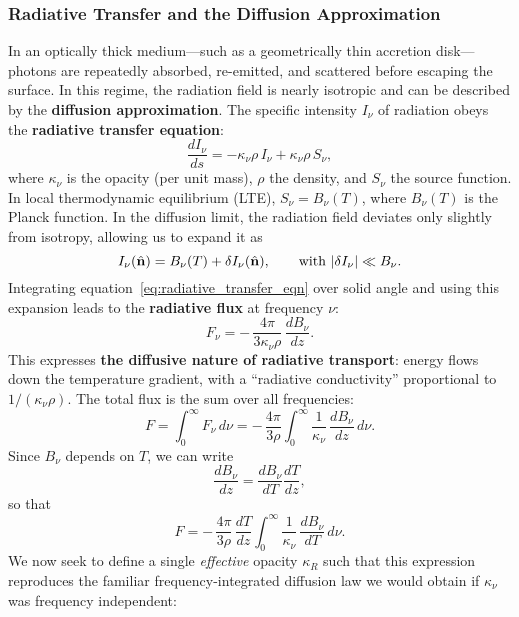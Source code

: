 \subsubsection*{Radiative Transfer and the Diffusion Approximation}

In an optically thick medium---such as a geometrically thin accretion disk---photons are repeatedly absorbed, re-emitted, and scattered before escaping the surface. In this regime, the radiation field is nearly isotropic and can be described by the \textbf{diffusion approximation}. The specific intensity $I_\nu$ of radiation obeys the \textbf{radiative transfer equation}:
\begin{equation}
\frac{dI_\nu}{ds} = -\kappa_\nu \rho\, I_\nu + \kappa_\nu \rho\, S_\nu,
\label{eq:radiative_transfer_eqn}
\end{equation}
where $\kappa_\nu$ is the opacity (per unit mass), $\rho$ the density, and $S_\nu$ the source function.  
In local thermodynamic equilibrium (LTE), $S_\nu = B_\nu(T)$, where $B_\nu(T)$ is the Planck function.
In the diffusion limit, the radiation field deviates only slightly from isotropy, allowing us to expand it as
\[
I_\nu(\hat{\bf n}) = B_\nu(T) + \delta I_\nu(\hat{\bf n}),
\qquad
\text{with } |\delta I_\nu| \ll B_\nu.
\]
Integrating equation~\eqref{eq:radiative_transfer_eqn} over solid angle and using this expansion leads to the \textbf{radiative flux} at frequency $\nu$:
\begin{equation}
F_\nu = -\,\frac{4\pi}{3\kappa_\nu\rho}\,\frac{dB_\nu}{dz}.
\label{eq:freq_diffusion_flux}
\end{equation}
This expresses \textbf{the diffusive nature of radiative transport}: energy flows down the temperature gradient, with a ``radiative conductivity'' proportional to $1/(\kappa_\nu\rho)$. The total flux is the sum over all frequencies:
\begin{equation}
F = \int_0^\infty F_\nu\,d\nu
= -\,\frac{4\pi}{3\rho}\int_0^\infty
\frac{1}{\kappa_\nu}\,\frac{dB_\nu}{dz}\,d\nu.
\end{equation}
Since $B_\nu$ depends on $T$, we can write
\[
\frac{dB_\nu}{dz} = \frac{dB_\nu}{dT}\frac{dT}{dz},
\]
so that
\begin{equation}
F = -\,\frac{4\pi}{3\rho}\,\frac{dT}{dz}
\int_0^\infty \frac{1}{\kappa_\nu}\,\frac{dB_\nu}{dT}\,d\nu.
\label{eq:flux_integral_dB}
\end{equation}
We now seek to define a single \emph{effective} opacity $\kappa_R$ such that this expression reproduces the familiar frequency-integrated diffusion law we would obtain if $\kappa_\nu$ was frequency independent:

